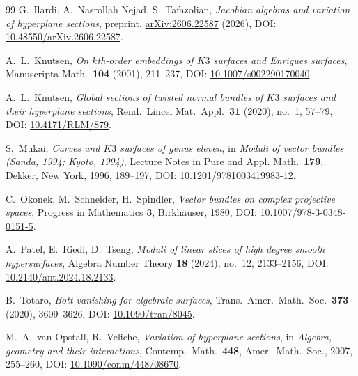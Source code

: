 \documentclass[a4paper,12pt,twoside,reqno]{amsart}
\numberwithin{equation}{section}
\theoremstyle{plain}
\theoremstyle{definition}
\theoremstyle{plain}
\theoremstyle{definition}
\begin{document}
\begin{thebibliography}{99}
G.~Ilardi, A.~Nasrollah Nejad, S.~Tafazolian, \emph{Jacobian algebras and variation of hyperplane sections}, preprint, \href{https://arxiv.org/abs/2606.22587}{arXiv:2606.22587} (2026), DOI: \href{https://doi.org/10.48550/arXiv.2606.22587}{10.48550/arXiv.2606.22587}.



A.~L.~Knutsen, \emph{On $k$th-order embeddings of $K3$ surfaces and Enriques surfaces}, Manuscripta Math.\ \textbf{104} (2001), 211--237, DOI: \href{https://doi.org/10.1007/s002290170040}{10.1007/s002290170040}.

A.~L.~Knutsen, \emph{Global sections of twisted normal bundles of $K3$ surfaces and their hyperplane sections}, Rend.\ Lincei Mat.\ Appl.\ \textbf{31} (2020), no.~1, 57--79, DOI: \href{https://doi.org/10.4171/RLM/879}{10.4171/RLM/879}.

S.~Mukai, \emph{Curves and $K3$ surfaces of genus eleven}, in \emph{Moduli of vector bundles (Sanda, 1994; Kyoto, 1994)}, Lecture Notes in Pure and Appl. Math.\ \textbf{179}, Dekker, New York, 1996, 189--197, DOI: \href{https://doi.org/10.1201/9781003419983-12}{10.1201/9781003419983-12}.

C.~Okonek, M.~Schneider, H.~Spindler, \emph{Vector bundles on complex projective spaces}, Progress in Mathematics \textbf{3}, Birkh\"auser, 1980, DOI: \href{https://doi.org/10.1007/978-3-0348-0151-5}{10.1007/978-3-0348-0151-5}.

A.~Patel, E.~Riedl, D.~Tseng, \emph{Moduli of linear slices of high degree smooth hypersurfaces}, Algebra Number Theory \textbf{18} (2024), no.~12, 2133--2156, DOI: \href{https://doi.org/10.2140/ant.2024.18.2133}{10.2140/ant.2024.18.2133}.

B.~Totaro, \emph{Bott vanishing for algebraic surfaces}, Trans.\ Amer.\ Math.\ Soc.\ \textbf{373} (2020), 3609--3626, DOI: \href{https://doi.org/10.1090/tran/8045}{10.1090/tran/8045}.





M.~A.~van Opstall, R.~Veliche, \emph{Variation of hyperplane sections}, in \emph{Algebra, geometry and their interactions}, Contemp.\ Math.\ \textbf{448}, Amer.\ Math.\ Soc., 2007, 255--260, DOI: \href{https://doi.org/10.1090/conm/448/08670}{10.1090/conm/448/08670}.



\end{thebibliography}
\end{document}
